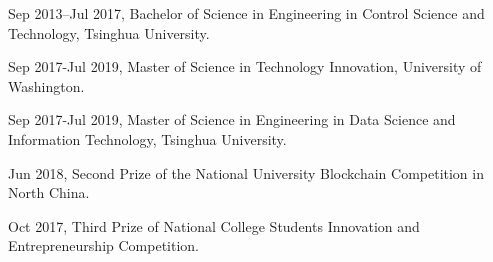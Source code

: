 \begin{resume}


Sep 2013–Jul 2017, Bachelor of Science in Engineering in Control Science and Technology, Tsinghua University.

Sep 2017-Jul 2019, Master of Science in Technology Innovation, University of Washington.

Sep 2017-Jul 2019, Master of Science in Engineering in Data Science and Information Technology, Tsinghua University.

Jun 2018, Second Prize of the National University Blockchain Competition in North China.

Oct 2017, Third Prize of National College Students Innovation and Entrepreneurship Competition.







\end{resume}
